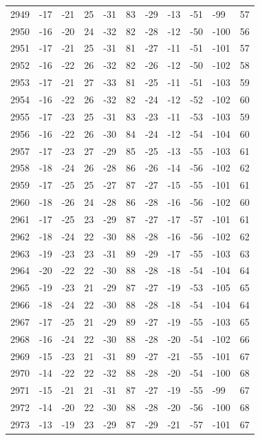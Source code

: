 \begin{table}[H]
\begin{tabular}{lllllllllll}
2949 & -17 & -21 & 25 & -31 & 83 & -29 & -13 & -51 & -99 & 57 \\
2950 & -16 & -20 & 24 & -32 & 82 & -28 & -12 & -50 & -100 & 56 \\
2951 & -17 & -21 & 25 & -31 & 81 & -27 & -11 & -51 & -101 & 57 \\
2952 & -16 & -22 & 26 & -32 & 82 & -26 & -12 & -50 & -102 & 58 \\
2953 & -17 & -21 & 27 & -33 & 81 & -25 & -11 & -51 & -103 & 59 \\
2954 & -16 & -22 & 26 & -32 & 82 & -24 & -12 & -52 & -102 & 60 \\
2955 & -17 & -23 & 25 & -31 & 83 & -23 & -11 & -53 & -103 & 59 \\
2956 & -16 & -22 & 26 & -30 & 84 & -24 & -12 & -54 & -104 & 60 \\
2957 & -17 & -23 & 27 & -29 & 85 & -25 & -13 & -55 & -103 & 61 \\
2958 & -18 & -24 & 26 & -28 & 86 & -26 & -14 & -56 & -102 & 62 \\
2959 & -17 & -25 & 25 & -27 & 87 & -27 & -15 & -55 & -101 & 61 \\
2960 & -18 & -26 & 24 & -28 & 86 & -28 & -16 & -56 & -102 & 60 \\
2961 & -17 & -25 & 23 & -29 & 87 & -27 & -17 & -57 & -101 & 61 \\
2962 & -18 & -24 & 22 & -30 & 88 & -28 & -16 & -56 & -102 & 62 \\
2963 & -19 & -23 & 23 & -31 & 89 & -29 & -17 & -55 & -103 & 63 \\
2964 & -20 & -22 & 22 & -30 & 88 & -28 & -18 & -54 & -104 & 64 \\
2965 & -19 & -23 & 21 & -29 & 87 & -27 & -19 & -53 & -105 & 65 \\
2966 & -18 & -24 & 22 & -30 & 88 & -28 & -18 & -54 & -104 & 64 \\
2967 & -17 & -25 & 21 & -29 & 89 & -27 & -19 & -55 & -103 & 65 \\
2968 & -16 & -24 & 22 & -30 & 88 & -28 & -20 & -54 & -102 & 66 \\
2969 & -15 & -23 & 21 & -31 & 89 & -27 & -21 & -55 & -101 & 67 \\
2970 & -14 & -22 & 22 & -32 & 88 & -28 & -20 & -54 & -100 & 68 \\
2971 & -15 & -21 & 21 & -31 & 87 & -27 & -19 & -55 & -99 & 67 \\
2972 & -14 & -20 & 22 & -30 & 88 & -28 & -20 & -56 & -100 & 68 \\
2973 & -13 & -19 & 23 & -29 & 87 & -29 & -21 & -57 & -101 & 67 \\

\end{tabular}
\end{table}
